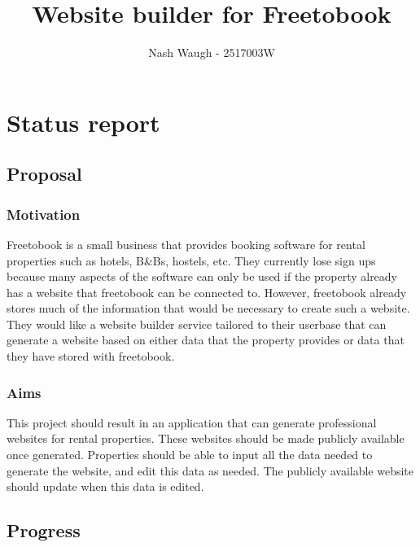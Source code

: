 \documentclass[11pt]{article}
\title{ Website builder for Freetobook }
\author{ Nash Waugh - 2517003W }
\begin{document}
\maketitle
    
    
     

\section{Status report}

\subsection{Proposal}\label{proposal}


\subsubsection{Motivation}\label{motivation}

Freetobook is a small business that provides booking software for rental properties such as hotels, B\&Bs, hostels, etc. They currently lose sign ups because many aspects of the software can only be used if the property already has a website that freetobook can be connected to. However, freetobook already stores much of the information that would be necessary to create such a website. They would like a website builder service tailored to their userbase that can generate a website based on either data that the property provides or data that they have stored with freetobook.


\subsubsection{Aims}\label{aims}

This project should result in an application that can generate professional websites for rental properties. These websites should be made publicly available once generated. Properties should be able to input all the data needed to generate the website, and edit this data as needed. The publicly available website should update when this data is edited.


\subsection{Progress}\label{progress}
\end{document}
